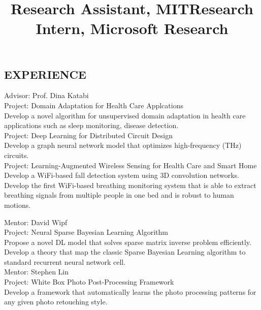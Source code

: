 \documentclass[margin]{res}
\newcommand{\Bullet}[1]{{\raisebox{0.25ex}{\tiny$\bullet$\ }}{#1}\\}
\begin{document}
\begin{resume}
\section{EXPERIENCE}
\title{\textbf{Research Assistant, MIT}}
\begin{position}
    Advisor: Prof. Dina Katabi \\
    Project: Domain Adaptation for Health Care Applcations\\
    \Bullet{Develop a novel algorithm for unsupervised domain adaptation in health care applications such as sleep monitoring, disease detection.}

    \vspace{-7mm}
    Project: Deep Learning for Distributed Circuit Design \\
    \Bullet{Develop a graph neural network model that optimizes high-frequency (THz) circuits.}

    \vspace{-7mm}
    Project: Learning-Augmented Wireless Sensing for Health Care and Smart Home \\
    \Bullet{Develop a WiFi-based fall detection system using 3D convolution networks.}
    \Bullet{Develop the first WiFi-based breathing monitoring system that is able to extract breathing signals from multiple people in one bed and is robust to human motions.}
\end{position}
\vspace{-5mm}

\title{\textbf{Research Intern, Microsoft Research}}
\begin{position}
    Mentor: David Wipf \\
    Project: Neural Sparse Bayesian Learning Algorithm \\
    \Bullet{Propose a novel DL model that solves sparse matrix inverse problem efficiently.}
    \Bullet{Develop a theory that map the classic Sparse Bayesian Learning algorithm to standard recurrent neural network cell.}

    \vspace{-7mm}
    Mentor: Stephen Lin \\
    Project: White Box Photo Post-Processing Framework \\
    \Bullet{Develop a framework that automatically learns the photo processing patterns for any given photo retouching style.}
\end{position}
\vspace{-5mm}


\end{resume}
\end{document}
